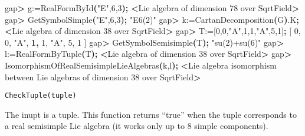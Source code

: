 \documentclass[
]{article}
\newenvironment{Shaded}{\begin{snugshade}}{\end{snugshade}}
\newcommand{\BuiltInTok}[1]{#1}
\newcommand{\ErrorTok}[1]{\textcolor[rgb]{0.64,0.00,0.00}{\textbf{#1}}}
\newcommand{\ExtensionTok}[1]{#1}
\newcommand{\KeywordTok}[1]{\textcolor[rgb]{0.13,0.29,0.53}{\textbf{#1}}}
\newcommand{\NormalTok}[1]{#1}
\newcommand{\OperatorTok}[1]{\textcolor[rgb]{0.81,0.36,0.00}{\textbf{#1}}}
\newcommand{\StringTok}[1]{\textcolor[rgb]{0.31,0.60,0.02}{#1}}
\begin{document}
\begin{Shaded}
\begin{Highlighting}[]
\ExtensionTok{gap}\OperatorTok{\textgreater{}}\NormalTok{ g:=RealFormById}\ErrorTok{(}\StringTok{"E"}\ExtensionTok{,6,3}\KeywordTok{);}
\OperatorTok{\textless{}}\NormalTok{Lie }\ExtensionTok{algebra}\NormalTok{ of dimension 78 over SqrtField}\OperatorTok{\textgreater{}}
\ExtensionTok{gap}\OperatorTok{\textgreater{}}\NormalTok{ GetSymbolSimple}\ErrorTok{(}\StringTok{"E"}\ExtensionTok{,6,3}\KeywordTok{);}
\StringTok{"E6(2)"}
\ExtensionTok{gap}\OperatorTok{\textgreater{}}\NormalTok{ k:=CartanDecomposition}\ErrorTok{(}\ExtensionTok{G}\KeywordTok{)}\ExtensionTok{.K}\KeywordTok{;}
\OperatorTok{\textless{}}\NormalTok{Lie }\ExtensionTok{algebra}\NormalTok{ of dimension 38 over SqrtField}\OperatorTok{\textgreater{}}
\ExtensionTok{gap}\OperatorTok{\textgreater{}}\NormalTok{ T:=[0,0,}\StringTok{"A"}\NormalTok{,1,1,}\StringTok{"A"}\NormalTok{,5,1]}\KeywordTok{;}
\BuiltInTok{[}\NormalTok{ 0, 0, }\StringTok{"A"}\NormalTok{, }\ErrorTok{1,}\NormalTok{ 1, }\StringTok{"A"}\NormalTok{, 5, 1 ]}
\ExtensionTok{gap}\OperatorTok{\textgreater{}}\NormalTok{ GetSymbolSemisimple}\ErrorTok{(}\ExtensionTok{T}\KeywordTok{);}
\StringTok{"su(2)+su(6)"}
\ExtensionTok{gap}\OperatorTok{\textgreater{}}\NormalTok{ l:=RealFormByTuple}\ErrorTok{(}\ExtensionTok{T}\KeywordTok{);}
\OperatorTok{\textless{}}\NormalTok{Lie }\ExtensionTok{algebra}\NormalTok{ of dimension 38 over SqrtField}\OperatorTok{\textgreater{}}
\ExtensionTok{gap}\OperatorTok{\textgreater{}}\NormalTok{ IsomorphismOfRealSemisimpleLieAlgebras}\ErrorTok{(}\ExtensionTok{k,l}\KeywordTok{);}
\OperatorTok{\textless{}}\NormalTok{Lie }\ExtensionTok{algebra}\NormalTok{ isomorphism between Lie algebras of dimension 38 over SqrtField}\OperatorTok{\textgreater{}}
\end{Highlighting}
\end{Shaded}

\begin{verbatim}
CheckTuple(tuple)
\end{verbatim}

The inupt is a tuple. This function returns ``true'' when the tuple
corresponds to a real semisimple Lie algebra (it works only up to 8
simple components).
\end{document}
